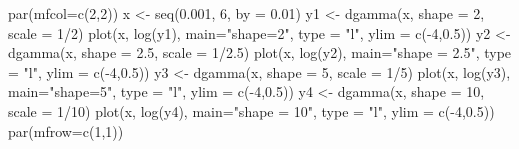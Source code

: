 \begin{Schunk}
\begin{Sinput}
 par(mfcol=c(2,2))
 x <- seq(0.001, 6, by = 0.01)
 y1 <- dgamma(x, shape = 2, scale = 1/2)
 plot(x, log(y1), main="shape=2", type = "l", ylim = c(-4,0.5))
 y2 <- dgamma(x, shape = 2.5, scale = 1/2.5)
 plot(x, log(y2), main="shape = 2.5", type = "l", ylim = c(-4,0.5))
 y3 <- dgamma(x, shape = 5, scale = 1/5)
 plot(x, log(y3), main="shape=5", type = "l", ylim = c(-4,0.5))
 y4 <- dgamma(x, shape = 10, scale = 1/10)
 plot(x, log(y4), main="shape = 10", type = "l", ylim = c(-4,0.5))
 par(mfrow=c(1,1))
\end{Sinput}
\end{Schunk}
